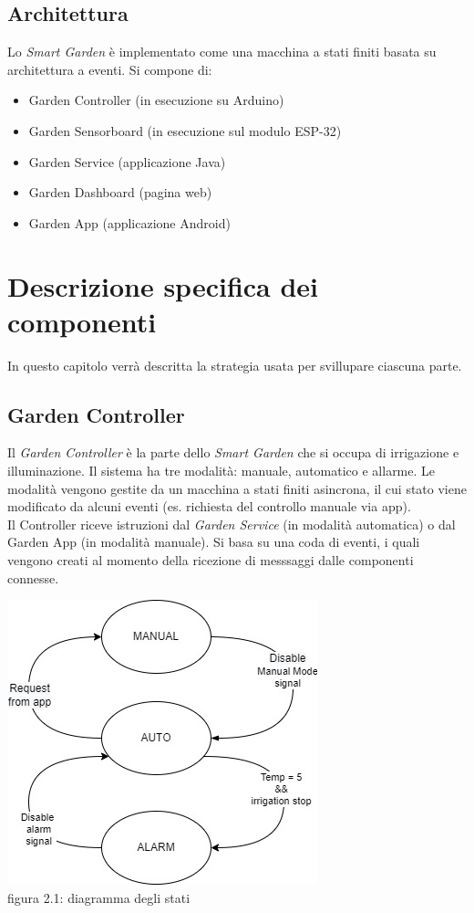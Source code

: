 \documentclass[a4paper,12pt]{report}
\begin{document}
\section{Architettura}
Lo \textit{Smart Garden} è implementato come una macchina a stati finiti basata su architettura a eventi. Si compone di:
\begin{itemize}
	\item Garden Controller (in esecuzione su Arduino)
	\item Garden Sensorboard (in esecuzione sul modulo ESP-32)
	\item Garden Service (applicazione Java)
	\item Garden Dashboard (pagina web)
	\item Garden App (applicazione Android)
\end{itemize}

\chapter{Descrizione specifica dei componenti}

In questo capitolo verrà descritta la strategia usata per svillupare ciascuna parte.

\section{Garden Controller}
Il \textit{Garden Controller} è la parte dello \textit{Smart Garden} che si occupa di irrigazione e illuminazione. Il sistema ha tre modalità: manuale, automatico e allarme. Le modalità vengono gestite da un macchina a stati finiti asincrona, il cui stato viene modificato da alcuni eventi (es. richiesta del controllo manuale via app). 
\\Il Controller riceve istruzioni dal \textit{Garden Service} (in modalità automatica) o dal {Garden App} (in modalità manuale). Si basa su una coda di eventi, i quali vengono creati al momento della ricezione di messsaggi dalle componenti connesse.

\begin{center}
	\includegraphics[scale = 0.65]{stateDiagram}
	\\figura 2.1: diagramma degli stati
\end{center}
\end{document}
